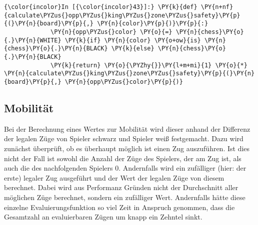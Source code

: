     \begin{Verbatim}[commandchars=\\\{\}]
{\color{incolor}In [{\color{incolor}43}]:} \PY{k}{def} \PY{n+nf}{calculate\PYZus{}opp\PYZus{}king\PYZus{}zone\PYZus{}safety}\PY{p}{(}\PY{n}{board}\PY{p}{,} \PY{n}{color}\PY{p}{)}\PY{p}{:}
             \PY{n}{opp\PYZus{}color} \PY{o}{=} \PY{n}{chess}\PY{o}{.}\PY{n}{WHITE} \PY{k}{if} \PY{n}{color} \PY{o+ow}{is} \PY{n}{chess}\PY{o}{.}\PY{n}{BLACK} \PY{k}{else} \PY{n}{chess}\PY{o}{.}\PY{n}{BLACK}
             \PY{k}{return} \PY{o}{\PYZhy{}}\PY{l+m+mi}{1} \PY{o}{*} \PY{n}{calculate\PYZus{}king\PYZus{}zone\PYZus{}safety}\PY{p}{(}\PY{n}{board}\PY{p}{,} \PY{n}{opp\PYZus{}color}\PY{p}{)}
\end{Verbatim}

    \subsection{Mobilität}\label{mobilituxe4t}

Bei der Berechnung eines Wertes zur Mobilität wird dieser anhand der
Differenz der legalen Züge von Spieler schwarz und Spieler weiß
festgemacht. Dazu wird zunächst überprüft, ob es überhaupt möglich ist
einen Zug auszuführen. Ist dies nicht der Fall ist sowohl die Anzahl der
Züge des Spielers, der am Zug ist, als auch die des nachfolgenden
Spielers 0. Andernfalls wird ein zufälliger (hier: der erste) legaler
Zug ausgeführt und der Wert der legalen Züge von diesem berechnet. Dabei
wird aus Performanz Gründen nicht der Durchschnitt aller möglichen Züge
berechnet, sondern ein zufälliger Wert. Andernfalls hätte diese einzelne
Evaluierungsfunktion so viel Zeit in Anspruch genommen, dass die
Gesamtzahl an evaluierbaren Zügen um knapp ein Zehntel sinkt.

